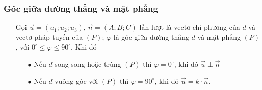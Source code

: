 \subsubsection{Góc giữa đường thẳng và mặt phẳng}
\begin{itemize}
	\item [\iconMT]   Gọi $\vec{u}=(u_1;u_2;u_3)$, $\vec{n}=(A;B;C)$ lần lượt là vectơ chỉ phương của  $d$ và vectơ pháp tuyến của $(P)$; $\varphi$ là góc giữa đường thẳng $d$ và mặt phẳng $(P)$, với $0^\circ \leq \varphi \leq 90^\circ$.
	Khi đó
	\item [\iconMT] 
	\begin{itemize}
		\item [$\bullet$] Nếu $d$ song song hoặc trùng $(P)$ thì $\varphi =0^\circ$, khi đó $\vec{u} \perp \vec{n}$
		\item [$\bullet$] Nếu $d$ vuông góc với $(P)$ thì $\varphi =90^\circ$, khi đó $\vec{u} =k \cdot \vec{n}$.
	\end{itemize}
\end{itemize}
